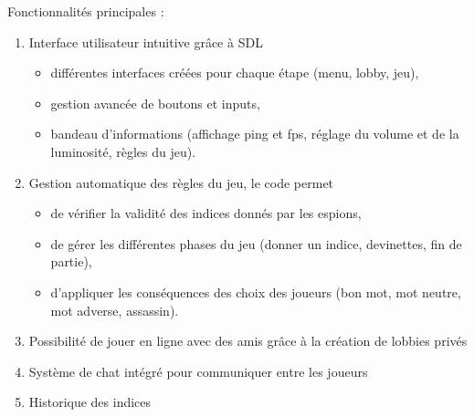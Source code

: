 \documentclass[12pt,a4paper]{article}
\begin{document}
            Fonctionnalités principales :
            \begin{enumerate}
                \item Interface utilisateur intuitive grâce à SDL
                    \begin{itemize}
                        \item différentes interfaces créées pour chaque étape (menu, lobby, jeu),
                        \item gestion avancée de boutons et inputs,
                        \item bandeau d'informations (affichage ping et fps, réglage du volume et de la luminosité, règles du jeu).
                    \end{itemize}
                \item Gestion automatique des règles du jeu, le code permet  
                    \begin{itemize}
                        \item de vérifier la validité des indices donnés par les espions,
                        \item de gérer les différentes phases du jeu (donner un indice, devinettes, fin de partie),
                        \item d'appliquer les conséquences des choix des joueurs (bon mot, mot neutre, mot adverse, assassin).
                    \end{itemize}
                \item Possibilité de jouer en ligne avec des amis grâce à la création de lobbies privés
                \item Système de chat intégré pour communiquer entre les joueurs
                \item Historique des indices 
            \end{enumerate}

    \newpage
\end{document}
